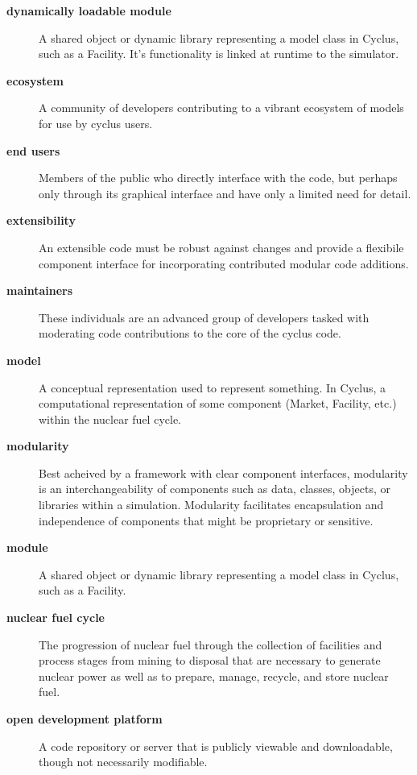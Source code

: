 \documentclass[letterpaper,10pt,english]{sphinxmanual}
\begin{document}
\begin{description}
\item[{\textbf{dynamically loadable module}}] \leavevmode
A shared object or dynamic library representing a model class in Cyclus,
such as a Facility. It's functionality is linked at runtime to the
simulator.

\item[{\textbf{ecosystem}}] \leavevmode
A community of developers contributing to a vibrant ecosystem of models
for use by cyclus users.

\item[{\textbf{end users}}] \leavevmode
Members of the public who directly interface with the code, but
perhaps only through its graphical interface and have only a limited need for detail.

\item[{\textbf{extensibility}}] \leavevmode
An extensible code must be robust against changes and provide a flexibile
component interface for incorporating contributed modular code additions.

\item[{\textbf{maintainers}}] \leavevmode
These individuals are an advanced group of developers tasked with
moderating code contributions to the core of the cyclus code.

\item[{\textbf{model}}] \leavevmode
A conceptual representation used to represent something. In Cyclus, a
computational representation of some component (Market, Facility, etc.)
within the nuclear fuel cycle.

\item[{\textbf{modularity}}] \leavevmode
Best acheived by a framework with clear component interfaces, modularity is
an interchangeability of components such as data, classes, objects, or libraries
within a simulation. Modularity facilitates encapsulation and independence
of components that might be proprietary or sensitive.

\item[{\textbf{module}}] \leavevmode
A shared object or dynamic library representing a model class in Cyclus,
such as a Facility.

\item[{\textbf{nuclear fuel cycle}}] \leavevmode
The progression of nuclear fuel through the collection of facilities and
process stages from mining to disposal that are necessary to generate
nuclear power as well as to prepare, manage, recycle, and store nuclear fuel.

\item[{\textbf{open development platform}}] \leavevmode
A code repository or server that is publicly viewable and downloadable,
though not necessarily modifiable.


\end{description}
\end{document}
